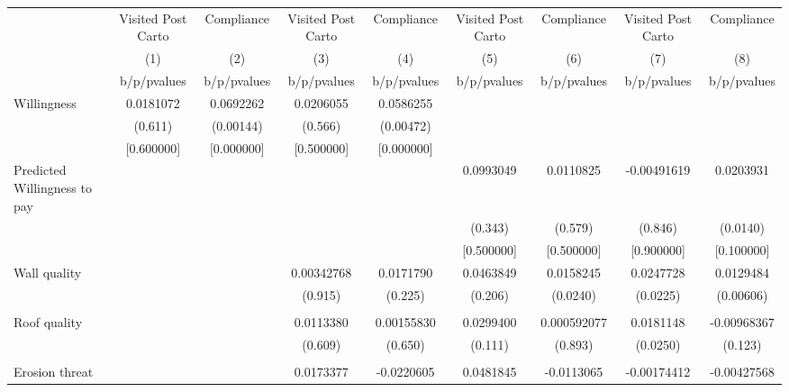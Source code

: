 {
\def\sym#1{\ifmmode^{#1}\else\(^{#1}\)\fi}
\begin{tabular}{l*{8}{c}}
\toprule
                &\multicolumn{1}{c}{Visited Post Carto}&\multicolumn{1}{c}{Compliance}&\multicolumn{1}{c}{Visited Post Carto}&\multicolumn{1}{c}{Compliance}&\multicolumn{1}{c}{Visited Post Carto}&\multicolumn{1}{c}{Compliance}&\multicolumn{1}{c}{Visited Post Carto}&\multicolumn{1}{c}{Compliance}\\
                &\multicolumn{1}{c}{(1)}&\multicolumn{1}{c}{(2)}&\multicolumn{1}{c}{(3)}&\multicolumn{1}{c}{(4)}&\multicolumn{1}{c}{(5)}&\multicolumn{1}{c}{(6)}&\multicolumn{1}{c}{(7)}&\multicolumn{1}{c}{(8)}\\
                &b/p/pvalues&b/p/pvalues&b/p/pvalues&b/p/pvalues&b/p/pvalues&b/p/pvalues&b/p/pvalues&b/p/pvalues\\
\midrule
Willingness     &0.0181072&0.0692262&0.0206055&0.0586255&         &         &         &         \\
                &  (0.611)&(0.00144)&  (0.566)&(0.00472)&         &         &         &         \\
                &[0.600000]&[0.000000]&[0.500000]&[0.000000]&         &         &         &         \\
Predicted Willingness to pay&         &         &         &         &0.0993049&0.0110825&-0.00491619&0.0203931\\
                &         &         &         &         &  (0.343)&  (0.579)&  (0.846)& (0.0140)\\
                &         &         &         &         &[0.500000]&[0.500000]&[0.900000]&[0.100000]\\
Wall quality    &         &         &0.00342768&0.0171790&0.0463849&0.0158245&0.0247728&0.0129484\\
                &         &         &  (0.915)&  (0.225)&  (0.206)& (0.0240)& (0.0225)&(0.00606)\\
                &         &         &         &         &         &         &         &         \\
Roof quality    &         &         &0.0113380&0.00155830&0.0299400&0.000592077&0.0181148&-0.00968367\\
                &         &         &  (0.609)&  (0.650)&  (0.111)&  (0.893)& (0.0250)&  (0.123)\\
                &         &         &         &         &         &         &         &         \\
Erosion threat  &         &         &0.0173377&-0.0220605&0.0481845&-0.0113065&-0.00174412&-0.00427568\\

\end{tabular}}
